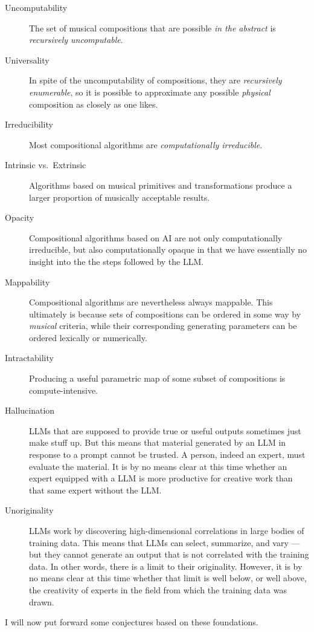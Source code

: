\documentclass[11pt,papersize=a4]{scrartcl}
\begin{document}
\begin{description}
\item[Uncomputability] The set of musical compositions that are possible \emph{in the abstract} is \emph{recursively uncomputable}.
\item[Universality] In spite of the uncomputability of compositions, they are \emph{recursively enumerable}, so it is possible to approximate any possible \emph{physical} composition as closely as one likes.
\item[Irreducibility] Most compositional algorithms are \emph{computationally irreducible}.
\item[Intrinsic vs.\ Extrinsic] Algorithms based on musical primitives and transformations produce a larger proportion of musically acceptable results.
\item[Opacity] Compositional algorithms based on AI are not only computationally irreducible, but also computationally opaque in that we have essentially no insight into the the steps followed by the LLM.
\item[Mappability] Compositional algorithms are nevertheless always mappable. This ultimately is because sets of compositions can be ordered in some way by \emph{musical} criteria, while their corresponding generating parameters can be ordered lexically or numerically.
\item[Intractability] Producing a useful parametric map of some subset of compositions is compute-intensive. 
\item[Hallucination] LLMs that are supposed to provide true or useful outputs sometimes just make stuff up. But this means that material generated by an LLM in response to a prompt cannot be trusted. A person, indeed an expert, must evaluate the material. It is by no means clear at this time whether an expert equipped with a LLM is more productive for creative work than that same expert without the LLM.
\item[Unoriginality] LLMs work by discovering high-dimensional correlations in large bodies of training data. This means that LLMs can select, summarize, and vary --- but they cannot generate an output that is not correlated with the training data. In other words, there is a limit to their originality. However, it is by no means clear at this time whether that limit is well below, or well above, the creativity of experts in the field from which the training data was drawn.
\end{description}

I will now put forward some conjectures based on these foundations.
\end{document}
